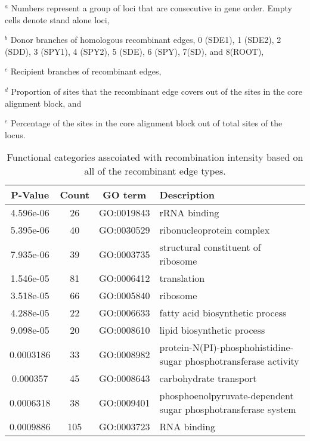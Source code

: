 \documentclass[10pt]{article}
\providecommand{\tabularnewline}{\\}
\begin{document}
\begin{table}[!ht]
{\begin{flushleft}
$^a$ Numbers represent a group of loci that are consecutive in gene order. Empty
cells denote stand alone loci,

$^b$ Donor branches of homologous recombinant edges, 0 (SDE1), 1 (SDE2), 2
(SDD), 3 (SPY1), 4 (SPY2), 5 (SDE), 6 (SPY), 7(SD), and 8(ROOT),

$^c$ Recipient branches of recombinant edges,

$^d$ Proportion of sites that the recombinant edge covers out of the sites in
the core alignment block, and

$^e$ Percentage of the sites in the core alignment block out of total sites of
the locus.
\end{flushleft}
}
\label{tab:genes-transfer}
\end{table}
\clearpage{}


\begin{table}
\caption{\label{tab:functional-all}Functional categories asscoiated with 
recombination intensity based on all of the recombinant edge types.}
\noindent \begin{centering}
\begin{tabular}{cccl}
\hline 
P-Value & Count & GO term & Description\tabularnewline
\hline 
4.596e-06 & 26 & GO:0019843 & rRNA binding\tabularnewline
5.395e-06 & 40 & GO:0030529 & ribonucleoprotein complex\tabularnewline
7.935e-06 & 39 & GO:0003735 & structural constituent of ribosome\tabularnewline
1.546e-05 & 81 & GO:0006412 & translation\tabularnewline
3.518e-05 & 66 & GO:0005840 & ribosome\tabularnewline
4.288e-05 & 22 & GO:0006633 & fatty acid biosynthetic process\tabularnewline
9.098e-05 & 20 & GO:0008610 & lipid biosynthetic process\tabularnewline
0.0003186 & 33 & GO:0008982 & protein-N(PI)-phosphohistidine-sugar phosphotransferase activity\tabularnewline
0.000357 & 45 & GO:0008643 & carbohydrate transport\tabularnewline
0.0006318 & 38 & GO:0009401 & phosphoenolpyruvate-dependent sugar phosphotransferase system\tabularnewline
0.0009886 & 105 & GO:0003723 & RNA binding\tabularnewline
\hline 
\end{tabular}
\par\end{centering}
\end{table}
\end{document}
